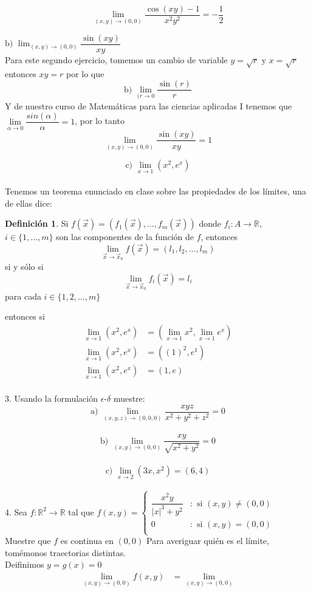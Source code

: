 \documentclass[letterpaper]{article}
\newcommand{\R}{\mathds{R}}
\renewcommand{\*}{\cdot}
\theoremstyle{definition}
\newtheorem{definition}{Definición}
\begin{document}
$$\displaystyle\lim_{(x,y) \to (0,0)} \dfrac{\cos(xy) - 1}{x^2y^2} = -\dfrac{1}{2}$$

\noindent$\text{b) }\displaystyle\lim_{(x,y) \to (0,0)} \dfrac{\sin(xy) }{xy}$\\
Para este segundo ejercicio, tomemos un cambio de variable $ y =\sqrt{r}  $ y $ x = \sqrt{r} $ entonces $ xy = r $ por lo que
$$\text{b) }\displaystyle\lim_{(r\to 0} \dfrac{\sin(r) }{r}$$
Y de nuestro curso de Matemáticas para las ciencias aplicadas I tenemos que $ \lim\limits_{\alpha \to 0} \dfrac{sin(\alpha)}{\alpha} = 1 $, por lo tanto
$$\displaystyle\lim_{(x,y) \to (0,0)} \dfrac{\sin(xy) }{xy} = 1$$

$$\text{c) }\displaystyle\lim_{x \to 1} (x^2 , e^x) $$\\[0.5cm]
Tenemos un teorema enunciado en clase sobre las propiedades de los límites, una de ellas dice:
\begin{definition}
	Si $ f(\vec{x}) = (f_1(\vec{x}), \dots, f_m(\vec{x})) $ donde $ f_i:A \to \R  $, $ i \in \{ 1, \dots, m \} $  son las componentes de la función de $ f $, entonces 
	\[ \lim\limits_{\vec{x} \to \vec{x}_0 } f(\vec{x}) = (l_1, l_2, \dots, l_m) \] si y sólo si\[ \lim\limits_{\vec{x} \to \vec{x}_0} f_i(\vec{x}) = l_i \] para cada $ i \in \{ 1, 2, \dots, m \} $
\end{definition}
entonces si
\begin{align*}
	\lim_{x \to 1} (x^2 , e^x) &=\left( \lim_{x \to 1} x^2, \lim_{x \to 1} e^x \right)\\
	\lim_{x \to 1} (x^2 , e^x) &=\left( (1)^2,  e^{1} \right)\\
	\lim_{x \to 1} (x^2 , e^x) &=\left( 1,  e \right)\\
\end{align*}

3.  Usando la formulación $\epsilon$-$\delta$ muestre: \\

 $$ \text{a) } \displaystyle\lim_{(x,y,z) \to (0,0,0)} \dfrac{xyz}{x^2 + y^2 + z^2} = 0$$\\

$$\text{b) }\displaystyle\lim_{(x,y) \to (0,0)} \dfrac{xy }{\sqrt{x^2 + y^2}} = 0$$\\

$$\text{c) }\displaystyle\lim_{x \to 2} (3x , x^2) = (6,4) $$\\[0.5cm]
4.  Sea $f: \mathbb{R}^2  \longrightarrow \mathbb{R}$ tal que $f(x,y) = \left\{
     \begin{array}{cl}
       \dfrac{x^2y}{\vert x \vert^3 + y^2} & : \text{ si } (x,y) \neq (0,0)\\
       0 & : \text{ si } (x,y) = (0,0)\\
     \end{array}
   \right.$ \\Muestre que $f$ es continua en $(0,0)$
Para averiguar quién es el límite, tomémonos traectorias distintas. \\
Deifinimos $ y = g(x) = 0 $
\begin{align*}
	\lim\limits_{(x,y)\to (0,0)} f(x,y) &= \lim\limits_{(x,y) \to (0,0)}
\end{align*}
\end{document}
